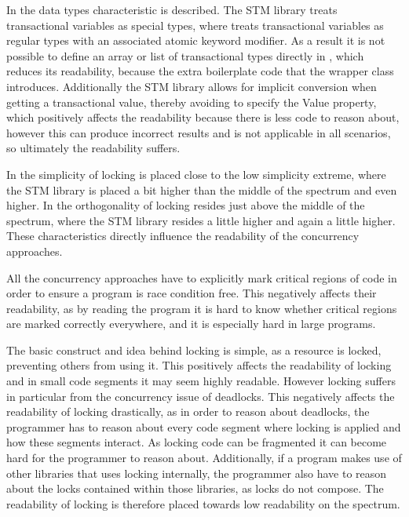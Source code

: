 In  the data types characteristic is described. The \ac{STM} library treats transactional variables as special types, where \stmname treats transactional variables as regular types with an associated atomic keyword modifier. As a result it is not possible to define an array or list of transactional types directly in \stmname, which reduces its readability, because the extra boilerplate code that the wrapper class introduces. Additionally the \ac{STM} library allows for implicit conversion when getting a transactional value, thereby avoiding to specify the Value property, which positively affects the readability because there is less code to reason about, however this can produce incorrect results and is not applicable in all scenarios, so ultimately the readability suffers.

In  the simplicity of locking is placed close to the low simplicity extreme, where the \ac{STM} library is placed a bit higher than the middle of the spectrum and \stmname even higher. In  the orthogonality of locking resides just above the middle of the spectrum, where the \ac{STM} library resides a little higher and \stmname again a little higher. These characteristics directly influence the readability of the concurrency approaches.

All the concurrency approaches have to explicitly mark critical regions of code in order to ensure a program is race condition free. This negatively affects their readability, as by reading the program it is hard to know whether critical regions are marked correctly everywhere, and it is especially hard in large programs.

The basic  construct and idea behind locking is simple, as a resource is locked, preventing others from using it. This positively affects the readability of locking and in small code segments it may seem highly readable. However locking suffers in particular from the concurrency issue of deadlocks. This negatively affects the readability of locking drastically, as in order to reason about deadlocks, the programmer has to reason about every code segment where locking is applied and how these segments interact. As locking code can be fragmented it can become hard for the programmer to reason about. Additionally, if a program makes use of other libraries that uses locking internally, the programmer also have to reason about the locks contained within those libraries, as locks do not compose. The readability of locking is therefore placed towards low readability on the spectrum.

